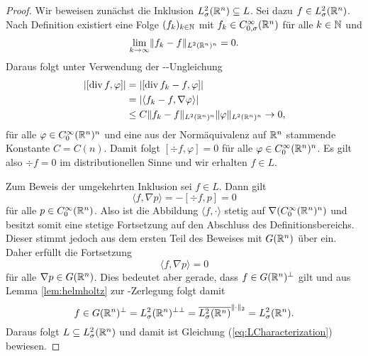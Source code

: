 \begin{proof}
  Wir beweisen zunächst die Inklusion $L_\sigma^2(\mathbb{R}^n) \subseteq L$.
  Sei dazu $f \in L_\sigma^2(\mathbb{R}^n)$.
  Nach Definition existiert eine Folge $(f_k)_{k \in \mathbb{N}}$ mit $f_k \in C_{0,\sigma}^\infty(\mathbb{R}^n)$ für alle $k \in \mathbb{N}$ und 
  $$
  \lim_{k \to \infty} \lVert f_k - f \rVert_{L^2(\mathbb{R}^n)^n} = 0.
  $$
  Daraus folgt unter Verwendung der \cauchy\hyp{}\schwartz\hyp{}Ungleichung
  \begin{align*}
    |[\mathrm{div\,} f, \varphi] |
    &= |[\mathrm{div\,} f_k - f, \varphi] | \\
    &= |\langle f_k - f, \nabla \varphi \rangle| \\
    & \leq C\lVert f_k - f \rVert_{L^2(\mathbb{R}^n)^n} \lVert \varphi \rVert_{L^2(\mathbb{R}^n)^n} 
    \to 0,
  \end{align*}
  für alle $\varphi \in C_0^\infty(\mathbb{R}^n)^n$ und eine aus der Normäquivalenz auf $\mathbb{R}^n$ stammende Konstante $C = C(n)$.
  Damit folgt $[\div f, \varphi] = 0$ für alle $\varphi \in C_0^\infty(\mathbb{R}^n)^n$.
  Es gilt also $\div f = 0$ im distributionellen Sinne und wir erhalten $f \in L$.

  Zum Beweis der umgekehrten Inklusion sei $f \in L$.
  Dann gilt
  $$
  \langle f, \nabla p \rangle = -[\div f, p] = 0
  $$
  für alle $p \in C_0^\infty(\mathbb{R}^n)$.
  Also ist die Abbildung $\langle f, \cdot\rangle$ stetig auf $\nabla (C_0^\infty(\mathbb{R}^n)^n)$ und besitzt somit eine stetige Fortsetzung auf den Abschluss des Definitionsbereichs. 
  Dieser stimmt jedoch aus dem ersten Teil des Beweises mit $G(\mathbb{R}^n)$ über ein.
  Daher erfüllt die Fortsetzung
  $$
  \langle f, \nabla p \rangle = 0 
  $$
  für alle $\nabla p \in G(\mathbb{R}^n)$.
  Dies bedeutet aber gerade, dass $f \in G(\mathbb{R}^n)^\perp$ gilt und aus Lemma \ref{lem:helmholtz} zur \helmholtz\hyp{}Zerlegung folgt damit
  $$
  f \in G(\mathbb{R}^n)^\perp 
  = L_\sigma^2(\mathbb{R}^n)^{\perp\perp} 
  = \overline{L_\sigma^2(\mathbb{R}^n)}^{\lVert \cdot \rVert_2}
  = L_\sigma^2(\mathbb{R}^n).
  $$
  Daraus folgt $L \subseteq L_\sigma^2(\mathbb{R}^n)$ und damit ist Gleichung (\ref{eq:LCharacterization}) bewiesen.
\end{proof}
